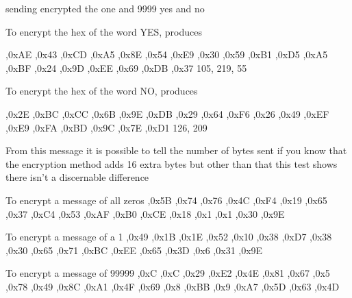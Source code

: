 sending encrypted the one and 9999
yes and no

To encrypt the hex of the word YES, produces 

,0xAE ,0x43 ,0xCD ,0xA5 ,0x8E ,0x54 ,0xE9 ,0x30
 ,0x59 ,0xB1 ,0xD5 ,0xA5 ,0xBF ,0x24 ,0x9D ,0xEE
 ,0x69 ,0xDB ,0x37
 105, 219, 55

To encrypt the hex of the word NO, produces 

 ,0x2E ,0xBC ,0xCC ,0x6B ,0x9E ,0xDB ,0x29 ,0x64
 ,0xF6 ,0x26 ,0x49 ,0xEF ,0xE9 ,0xFA ,0xBD ,0x9C
 ,0x7E ,0xD1
126, 209

From this message it is possible to tell the number of bytes sent if you know that the encryption method adds 16 extra bytes but other than that this test shows there isn't a discernable difference


To encrypt a message of all zeros
,0x5B ,0x74 ,0x76 ,0x4C ,0xF4 ,0x19 ,0x65 ,0x37
 ,0xC4 ,0x53 ,0xAF ,0xB0 ,0xCE ,0x18 ,0x1 ,0x1
 ,0x30 ,0x9E

To encrypt a message of a 1
,0x49 ,0x1B ,0x1E ,0x52 ,0x10 ,0x38 ,0xD7 ,0x38
 ,0x30 ,0x65 ,0x71 ,0xBC ,0xEE ,0x65 ,0x3D ,0x6
 ,0x31 ,0x9E

To encrypt a message of 99999
,0xC ,0xC ,0x29 ,0xE2 ,0x4E ,0x81 ,0x67 ,0x5
 ,0x78 ,0x49 ,0x8C ,0xA1 ,0x4F ,0x69 ,0x8 ,0xBB
 ,0x9 ,0xA7 ,0x5D ,0x63 ,0x4D



